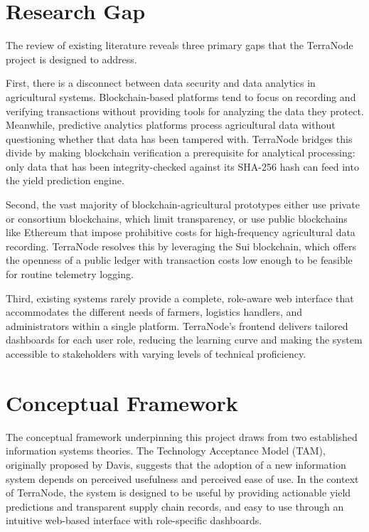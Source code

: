 \section{Research Gap}

The review of existing literature reveals three primary gaps that the TerraNode project is designed to address.

First, there is a disconnect between data security and data analytics in agricultural systems. Blockchain-based platforms tend to focus on recording and verifying transactions without providing tools for analyzing the data they protect. Meanwhile, predictive analytics platforms process agricultural data without questioning whether that data has been tampered with. TerraNode bridges this divide by making blockchain verification a prerequisite for analytical processing: only data that has been integrity-checked against its SHA-256 hash can feed into the yield prediction engine.

Second, the vast majority of blockchain-agricultural prototypes either use private or consortium blockchains, which limit transparency, or use public blockchains like Ethereum that impose prohibitive costs for high-frequency agricultural data recording. TerraNode resolves this by leveraging the Sui blockchain, which offers the openness of a public ledger with transaction costs low enough to be feasible for routine telemetry logging.

Third, existing systems rarely provide a complete, role-aware web interface that accommodates the different needs of farmers, logistics handlers, and administrators within a single platform. TerraNode's frontend delivers tailored dashboards for each user role, reducing the learning curve and making the system accessible to stakeholders with varying levels of technical proficiency.

\section{Conceptual Framework}

The conceptual framework underpinning this project draws from two established information systems theories. The Technology Acceptance Model (TAM), originally proposed by Davis, suggests that the adoption of a new information system depends on perceived usefulness and perceived ease of use. In the context of TerraNode, the system is designed to be useful by providing actionable yield predictions and transparent supply chain records, and easy to use through an intuitive web-based interface with role-specific dashboards.

